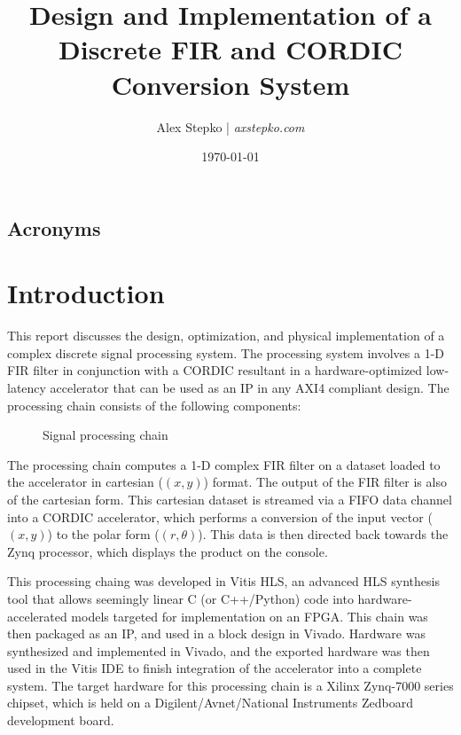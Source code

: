 \documentclass[11pt]{report}
\title{\Large\textbf{Design and Implementation of a Discrete FIR and CORDIC Conversion System}}
\author{Alex Stepko | \emph{axstepko.com}}
\affil{The Pennsylvania State University\\School of Electrical Engineering and Computer Science\\\normalsize{Zheyu Li, PhD. Candidate}}
\date{\today}
\begin{document}
\begin{titlepage}
    \maketitle
\end{titlepage}
\begin{singlespace}
    \tableofcontents
\end{singlespace}
\newpage
\section*{Acronyms}
\begin{multicols}{2}
    \raggedright
    \printacronyms[heading=none]
\end{multicols}
\listoffigures
\listoftables
\lstlistoflistings
\newpage

\chapter{Introduction}

This report discusses the design, optimization, and physical implementation of a complex discrete signal processing system. The processing system involves a 1-D \ac{FIR} filter in conjunction with a \ac{CORDIC} resultant in a hardware-optimized low-latency accelerator that can be used as an IP in any AXI4 compliant design. The processing chain consists of the following components:
\begin{figure}[h!]
	\centering
	\fboxsep=3mm
	\caption{Signal processing chain}
	\label{processingChainGraph}
\end{figure}

The processing chain computes a 1-D complex FIR filter on a dataset loaded to the accelerator in cartesian ($(x, y)$) format. The output of the FIR filter is also of the cartesian form. This cartesian dataset is streamed via a FIFO data channel into a CORDIC accelerator, which performs a conversion of the input vector ($(x, y)$) to the polar form ($(r, \theta)$). This data is then directed back towards the Zynq processor, which displays the product on the console.

This processing chaing was developed in Vitis HLS, an advanced \ac{HLS} synthesis tool that allows seemingly linear C (or C++/Python) code into hardware-accelerated models targeted for implementation on an \ac{FPGA}. This chain was then packaged as an \ac{IP}, and used in a block design in Vivado. Hardware was synthesized and implemented in Vivado, and the exported hardware was then used in the Vitis IDE to finish integration of the accelerator into a complete system. The target hardware for this processing chain is a Xilinx Zynq-7000 series chipset, which is held on a Digilent/Avnet/National Instruments Zedboard development board.
\end{document}

